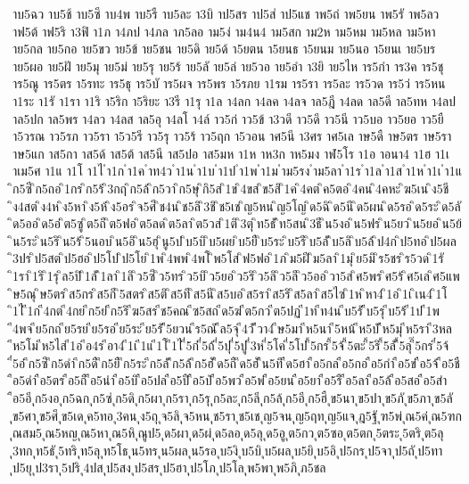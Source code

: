 {าบ5ฉว
าบ5ช้
าบ5ซึ
าบ4พ
าบ5รื
าบ5ละ
า3บิ
าป5สร
าป5ส่
าป5แช
าพ5ถ่
าพ5ยน
าพ5รั
าพ5ลว
าฟ5ต้
าฟ5ริ
า3ฟิ
า1ภ
า4ภป
า4ภล
าภ5ลอ
าม5ง่
าม4น4
าม5สก
าม2ห
าม5หม
าม5หล
าม5หา
าย5กล
าย5กอ
าย5ขว
าย5ข้
าย5ชน
าย5ดิ
าย5ด้
า5ยตน
า5ยนธ
า5ยนม
าย5นอ
า5ยนเ
าย5บร
าย5ผอ
าย5ฝั
าย5มุ
าย5ม่
าย5รุ
าย5ร้
าย5ลั
าย5ล่
าย5วอ
าย5อำ
า3ยิ
าย5ไห
าร5กำ
าร3ค
าร5ชุ
าร5ณู
าร5ตร
า5รทะ
าร5ธุ
าร5บั
าร5ผจ
าร5พร
า5รภย
า1รม
าร5รา
าร5ละ
าร5วด
าร5ว่
าร5หน
า1ระ
า1รั
า1รา
า1ริ
า5ริก
า5ริยะ
า3รี
า1รุ
า1ล
า4ลก
า4ลค
า4ลจ
าล5ฎี
า4ลด
าล5ดี
าล5ทห
า4ลป
าล5ปก
าล5พร
า4ลว
า4ลส
าล5อุ
า4ลโ
า4ล์
าว5ก่
าว5ข้
า3วดี
าว5ดึ
าว5นี
าว5บอ
าว5ยอ
าว5ยื
า5วรณ
าว5รภ
าว5รา
า5ว5รี
าว5รุ
าว5ร้
าว5ฤก
า5วอน
าศ5นี
า3ศร
าศ5เล
าษ5ดื
าษ5ตร
าษ5รา
าษ5แก
าส5กา
าส5ด้
าส5ต้
าส5นี
าส5ปอ
าส5มห
า1ห
าห3ก
าห5มง
าฬ5โร
า1อ
าอนา4
า1ฮ
า1เ
าเม5ศ
า1แ
า1โ
า1ไ
ำ1ก
ำ1ค
ำท4ว
ำ1น
ำ1บ
ำ1ป
ำ1พ
ำ1ม
ำม5รง
ำม5ลา
ำ1ร
ำ1ล
ำ1ส
ำ1ห
ำ1เ
ำ1แ
ิก5ซี
ิก5ถอ
ิ1กร
ิก5ร้
ิ3กฤ
ิก5ล้
ิก5วา
ิก5ษุ
ิกิ5ส
ิ1ข
ิ4ขส
ิข5สิ
ิ1ค
ิ4คต
ิค5ตอ
ิ4คน
ิ4คหะ
ิฆ5เน
ิง5ชี
ิง4สต
ิง4ห
ิง5หา
ิง5ห้
ิง5อร
ิจ5ศี
ิช4น
ิช5ลิ
ิ3ชิ
ิช5เช
ิญ5หน
ิญ5โญ
ิด5ฉิ
ิด5นี
ิด5ผน
ิด5รอ
ิด5ระ
ิด5ลั
ิด5ออ
ิด5อ่
ิต5ซู
ิต5ถี
ิต5ฟอ
ิต5ลด
ิต5ลา
ิต5วส
ิ1ติ
ิ3ตุ
ิท5ธั
ิท5สน
ิ3ธี
ิน5งอ
ิน5ฟร
ิน5ยว
ิน5ยอ
ิน5ย้
ิน5ระ
ิน5ริ
ิน5ร้
ิ5นอบ
ิน5อิ
ิน5ฮุ
ินู5ป
ิบ5บิ
ิบ5ผย
ิบ5ยื
ิบ5ระ
ิบ5รี
ิบ5ลั
ิบ5ลิ
ิบ5ล้
ิป4ก
ิป5ทอ
ิป5ผล
ิ3ปร
ิป5สต
ิป5ฮอ
ิป5โป
ิป5โย
ิ1พ
ิ4พพ
ิ4พโ
ิพ5โส
ิฟ5ฟอ
ิ1ภ
ิม5ฝี
ิม5ลา
ิ1มุ
ิย5มิ
ิร5ชร
ิร5วด
ิ1รั
ิ1รา
ิ1ริ
ิ1รุ
ิล5ปิ
ิ1ลั
ิ1ลา
ิ1ลิ
ิว5ซี
ิว5ทร
ิว5บิ
ิว5ยอ
ิว5ริ
ิว5ลิ
ิว5ลึ
ิว5ออ
ิวา5ส
ิศ5พร
ิศ5ร้
ิศ5เล
ิศ5แพ
ิษ5ณุ
ิษ5ตร
ิส5กร
ิส5กี
ิ5สตร
ิส5ติ
ิส5ที
ิส5นี
ิส5บอ
ิส5รา
ิส5ริ
ิส5ลา
ิส5ไซ
ิ1ห
ิหา4
ิ1อ
ิ1เ
ิเน4
ิ1โ
ิ1ไ
ี1ก
ี4กต
ี4กย
ีก5ย่
ีก5ริ
ีฆ5สร
ีช5คณ
ีซ5สถ
ีด5ฆ่
ีต5กว
ีต5ปฏ
ี1ท
ีท4น
ีบ5รั
ีบ5รุ
ีบ5ร้
ี1ป
ี1พ
ี4พจ
ีย5กถ
ีย5รย
ีย5รอ
ีย5ระ
ีย5รั
ี5ยวน
ีร5ณั
ีล5จุ
ี4วั
ีวา4
ีษ5มา
ีห5นา
ี5หน้
ีห5บั
ีห5มุ
ีห5รา
ี3หล
ีห5โม
ีห5ไส
ี1อ
ีอ4ร
ีอา4
ี1เ
ี1แ
ี1โ
ี1ไ
ี่5ก่
ี่5ถ้
ี่5ปุ
ี่5ปู
ี่3ห
ี่5โค
ี่5โป
ี้5กร
ี้5จ้
ี้5ตะ
ี้5ริ
ี้5ลั
ี้5ลุ
ี๊5กร
ี๋5จ้
ี๋5อ๋
ึก5ซึ
ึก5ดำ
ึก5ดื
ึก5ยื
ึก5ระ
ึก5ลั
ึก5ล้
ึก5ฮั
ึด5ถื
ึด5ฮั
ึน5ทึ
ืด5ฮา
ือ5กล
ือ5กอ
ือ5กำ
ือ5ข่
ือ5จ้
ือ5ชื
ือ5ดำ
ือ5ตร
ือ5ถื
ือ5นำ
ือ5บิ
ือ5ปล
ือ5ปื
ือ5ป่
ือ5พว
ือ5พ่
ือ5ยน
ือ5ยา
ือ5รื
ือ5ลา
ือ5ล้
ือ5สอ
ือ5สำ
ือ5อี
ุก5งอ
ุก5ฉก
ุก5ซ่
ุก5ดิ
ุก5ผา
ุก5รา
ุก5รุ
ุก5ละ
ุก5ลี
ุก5ล้
ุก5อี
ุก5ฮื
ุข5นา
ุข5ปา
ุข5ภั
ุข5ภา
ุข5ลั
ุข5ศา
ุข5ศึ
ุข5เด
ุค5ทอ
ุ3คน
ุง5ถุ
ุจ5ลิ
ุจ5หน
ุช5รา
ุช5เช
ุญ5จน
ุญ5ฤท
ุญ5แจ
ุฎ5ฐั
ุฑ5พ่
ุณ5ค่
ุณ5ฑก
ุณสม5
ุณ5หญ
ุณ5หา
ุณ5หิ
ุณูป5
ุด5ผา
ุด5ผ่
ุด5ลอ
ุด5ลุ
ุด5อู
ุต5กว
ุต5ซอ
ุต5ตก
ุ5ตระ
ุ5ตริ
ุต5ลุ
ุ3ทก
ุท5ธั
ุ5ทริ
ุท5ลุ
ุท5โธ
ุน5ทร
ุน5ผล
ุน5รอ
ุบ5งิ
ุบ5บิ
ุบ5ผล
ุบ5ยิ
ุบ5อิ
ุป5กร
ุป5จา
ุป5ถั
ุป5ทา
ุป5ยุ
ุป3รา
ุ5ปริ
ุ4ปส
ุป5สง
ุป5สร
ุป5ฮา
ุป5โภ
ุป5โล
ุพ5พา
ุพ5ภิ
ุภ5ชล
}
